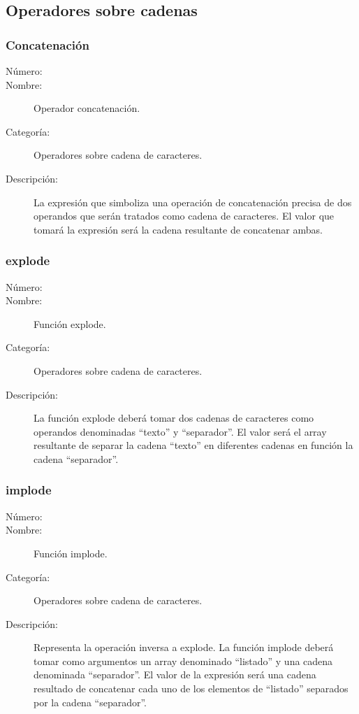 \subsection{Operadores sobre cadenas}

\subsubsection{Concatenación}
	\begin{description}
		\item [Número:] \cn
		\item [Nombre:] Operador concatenación.
		\item [Categoría:] Operadores sobre cadena de caracteres.
		\item [Descripción:] La expresión que simboliza una operación de concatenación precisa de dos operandos que serán
		tratados como cadena de caracteres. El valor que tomará la expresión será la cadena resultante de concatenar ambas.
	\end {description}

\subsubsection{explode}
	\begin{description}
		\item [Número:] \cn
		\item [Nombre:] Función explode.
		\item [Categoría:] Operadores sobre cadena de caracteres.
		\item [Descripción:] La función explode deberá tomar dos cadenas de caracteres como operandos denominadas ``texto'' y ``separador''.
		El valor será el array resultante de separar la cadena ``texto'' en diferentes cadenas en función la cadena ``separador''.
	\end {description}

\subsubsection{implode}
	\begin{description}
		\item [Número:] \cn
		\item [Nombre:] Función implode.
		\item [Categoría:] Operadores sobre cadena de caracteres.
		\item [Descripción:] Representa la operación inversa a explode. La función implode deberá tomar como argumentos un array denominado
		``listado'' y una cadena denominada ``separador''. El valor de la expresión será una cadena resultado de concatenar cada uno
		de los elementos de ``listado'' separados por la cadena ``separador''.
	\end {description}

